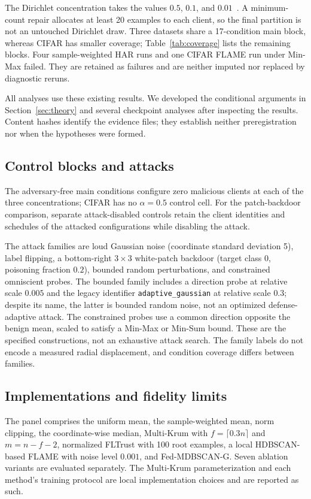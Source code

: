 \documentclass[journal]{IEEEtran}
\newcommand{\method}{Fed-MDBSCAN-G}
\begin{document}
The Dirichlet concentration takes the values $0.5$, $0.1$, and $0.01$~\cite{hsu2019}. A minimum-count repair allocates at least 20 examples to each client, so the final partition is not an untouched Dirichlet draw. Three datasets share a 17-condition main block, whereas CIFAR has smaller coverage; Table~\ref{tab:coverage} lists the remaining blocks. Four sample-weighted HAR runs and one CIFAR FLAME run under Min-Max failed. They are retained as failures and are neither imputed nor replaced by diagnostic reruns.

All analyses use these existing results. We developed the conditional arguments in Section~\ref{sec:theory} and several checkpoint analyses after inspecting the results. Content hashes identify the evidence files; they establish neither preregistration nor when the hypotheses were formed.

\subsection{Control blocks and attacks}
The adversary-free main conditions configure zero malicious clients at each of the three concentrations; CIFAR has no $\alpha=0.5$ control cell. For the patch-backdoor comparison, separate attack-disabled controls retain the client identities and schedules of the attacked configurations while disabling the attack.

The attack families are loud Gaussian noise (coordinate standard deviation 5), label flipping, a bottom-right $3\times3$ white-patch backdoor (target class 0, poisoning fraction $0.2$), bounded random perturbations, and constrained omniscient probes. The bounded family includes a direction probe at relative scale $0.005$ and the legacy identifier \texttt{adaptive\_gaussian} at relative scale $0.3$; despite its name, the latter is bounded random noise, not an optimized defense-adaptive attack. The constrained probes use a common direction opposite the benign mean, scaled to satisfy a Min-Max or Min-Sum bound. These are the specified constructions, not an exhaustive attack search. The family labels do not encode a measured radial displacement, and condition coverage differs between families.

\subsection{Implementations and fidelity limits}\label{sec:fidelity}
The panel comprises the uniform mean, the sample-weighted mean, norm clipping, the coordinate-wise median, Multi-Krum with $f=\lceil0.3n\rceil$ and $m=n-f-2$, normalized FLTrust with 100 root examples, a local HDBSCAN-based FLAME with noise level $0.001$, and \method{}. Seven ablation variants are evaluated separately. The Multi-Krum parameterization and each method's training protocol are local implementation choices and are reported as such.
\end{document}
